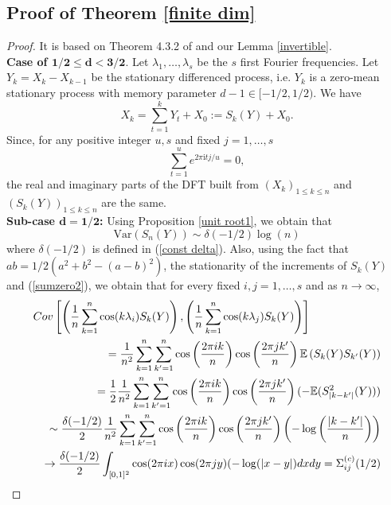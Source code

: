 \documentclass[10pt,a4paper]{amsart}
\numberwithin{equation}{section}
\def\i{\mathrm{i}}
\begin{document}
\subsection{Proof of Theorem \ref{finite dim}}
\begin{proof} 
It is based on Theorem 4.3.2 of \cite{MR2977317} and our Lemma \ref{invertible}.\\
{\bf Case of $\mathbf{1/2\le d<3/2.}$} Let $\lambda_1,\ldots,\lambda_s$ be the $s$ first  Fourier frequencies. 
Let $Y_k=X_k-X_{k-1}$ be the stationary differenced process, i.e. $Y_k$ is a zero-mean stationary process with memory parameter $d-1\in[-1/2,1/2)$. We have
$$
X_k=\sum_{t=1}^kY_t+X_0:=S_k(Y)+X_0.
$$
Since, for any positive integer $u,s$ and fixed $j=1,\ldots,s$
\begin{equation}\label{sumzero2}
\sum_{t=1}^ue^{2\pi \i tj/u}=0,
\end{equation}
the real and imaginary parts of the DFT built from $(X_k)_{1\le k\le n}$ and $(S_k(Y))_{1\le k\le n}$ are the same. \\
{\bf Sub-case $\mathbf{d=1/2}$:} 
Using Proposition \ref{unit root1}, we obtain that 
$$
\textrm{Var}(S_n(Y))\sim \delta(-1/2)\log(n)
$$
where $\delta(-1/2)$ is defined in (\ref{const delta}).
Also, using the fact that $ab=1/2\left(a^2+b^2-(a-b)^2\right)$, the stationarity of the increments of $S_k(Y)$ and (\ref{sumzero2}), we obtain that for every fixed $i,j=1,\ldots,s$ and as $n\to\infty$, 
\begin{eqnarray}\label{of course}
\lefteqn{
    \textrm{Cov}\left[\left(\frac{1}{n}\sum_{k=1}^n\cos(k\lambda_{i})S_k(Y)\right),\left(\frac{1}{n}\sum_{k=1}^n\cos(k\lambda_{j})S_k(Y)\right)\right]}\nonumber\\
    &&=\frac{1}{n^2}\sum_{k=1}^n\sum_{k'=1}^n\cos\left(\frac{2\pi ik}{n}\right)\cos\left(\frac{2\pi jk'}{n}\right)\mathbb{E}\left(S_k(Y)S_{k'}(Y)\right)\nonumber\\ 
    &&=\frac{1}{2}\frac{1}{n^2}\sum_{k=1}^n\sum_{k'=1}^n\cos\left(\frac{2\pi ik}{n}\right)\cos\left(\frac{2\pi jk'}{n}\right)(-\mathbb{E}(S^2_{\vert k-k'\vert}(Y)))\nonumber\\
    &&\sim\frac{\delta(-1/2)}{2}\frac{1}{n^2}\sum_{k=1}^n\sum_{k'=1}^n\cos\left(\frac{2\pi ik}{n}\right)\cos\left(\frac{2\pi jk'}{n}\right)\left(-\log\left(\frac{\vert k-k'\vert}{n}\right)\right)\nonumber\\
&&\to\frac{\delta(-1/2)}{2}\int_{[0,1]^2}\cos(2\pi ix)\cos(2\pi jy)(-\log(\vert x- y\vert)dxdy=\Sigma_{ij}^{(c)}(1/2)
\end{eqnarray}

\end{proof}
\end{document}
